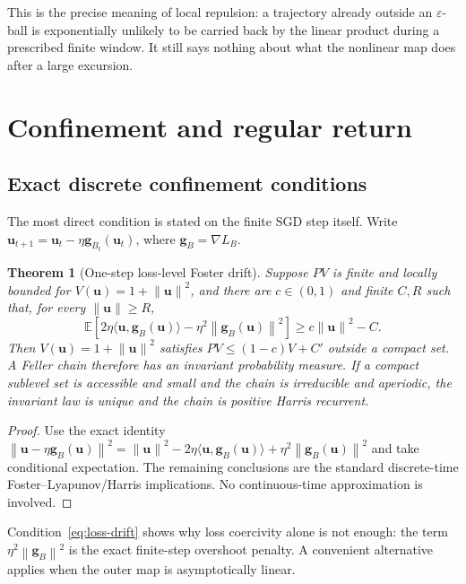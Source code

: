 \documentclass[10pt]{article}
\newtheorem{theorem}{Theorem}[section]
\theoremstyle{definition}
\theoremstyle{remark}
\newcommand{\E}{\mathbb E}
\newcommand{\norm}[1]{\left\lVert#1\right\rVert}
\newcommand{\uvec}{\mathbf u}
\begin{document}
This is the precise meaning of local repulsion: a trajectory already outside
an $\varepsilon$-ball is exponentially unlikely to be carried back by the
linear product during a prescribed finite window.  It still says nothing
about what the nonlinear map does after a large excursion.

\section{Confinement and regular return}

\subsection{Exact discrete confinement conditions}

The most direct condition is stated on the finite SGD step itself.  Write
$\uvec_{t+1}=\uvec_t-\eta\mathbf g_{B_t}(\uvec_t)$, where
$\mathbf g_B=\nabla L_B$.

\begin{theorem}[One-step loss-level Foster drift]
\label{thm:loss-drift}
Suppose $PV$ is finite and locally bounded for
$V(\uvec)=1+\norm{\uvec}^2$, and there are $c\in(0,1)$ and finite $C,R$
such that, for every
$\norm{\uvec}\ge R$,
\begin{equation}
 \E\!\left[2\eta\langle\uvec,\mathbf g_B(\uvec)\rangle
 -\eta^2\norm{\mathbf g_B(\uvec)}^2\right]
 \ge c\norm{\uvec}^2-C.
 \label{eq:loss-drift}
\end{equation}
Then $V(\uvec)=1+\norm{\uvec}^2$ satisfies
$PV\le(1-c)V+C'$ outside a compact set.  A Feller chain therefore has an
invariant probability measure.  If a compact sublevel set is accessible and
small and the chain is irreducible and aperiodic, the invariant law is unique
and the chain is positive Harris recurrent.
\end{theorem}

\begin{proof}
Use the exact identity
$\norm{\uvec-\eta\mathbf g_B(\uvec)}^2=\norm{\uvec}^2
-2\eta\langle\uvec,\mathbf g_B(\uvec)\rangle
+\eta^2\norm{\mathbf g_B(\uvec)}^2$ and take conditional expectation.
The remaining conclusions are the standard discrete-time
Foster--Lyapunov/Harris implications.  No continuous-time approximation is
involved.
\end{proof}

Condition~\eqref{eq:loss-drift} shows why loss coercivity alone is not
enough: the term $\eta^2\norm{\mathbf g_B}^2$ is the exact finite-step
overshoot penalty.  A convenient alternative applies when the outer map is
asymptotically linear.
\end{document}

